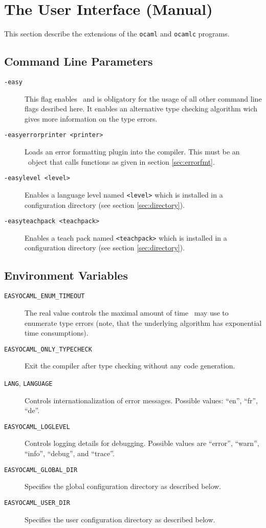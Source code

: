 
\section{The User Interface (Manual)}
\label{sec:manual}

This section describe the extensions of the \texttt{ocaml} and \texttt{ocamlc} programs.

\subsection{Command Line Parameters}
\label{sec:commandlineflags}

\begin{description}
  \item[\texttt{-easy}] This flag enables \easyocaml\ and is obligatory for
    the usage of all other command line flags desribed here.
    It enables an alternative type checking algorithm wich gives more
    information on the type errors.
  \item[\texttt{-easyerrorprinter <printer>}] Loads an error formatting plugin
    into the compiler. This must be an \ocaml\ object that calls functions as
    given in section \ref{sec:errorfmt}.
  \item[\texttt{-easylevel <level>}] Enables a language level named
    \texttt{<level>} which is installed in a configuration directory (see
    section \ref{sec:directory}).
  \item[\texttt{-easyteachpack <teachpack>}] Enables a teach pack named
    \texttt{<teachpack>} which is installed in a configuration directory (see
    section \ref{sec:directory}).
\end{description}

\subsection{Environment Variables}
\label{sec:envvars}

\begin{description}
  \item[\texttt{EASYOCAML\_ENUM\_TIMEOUT}] \label{man:timeout}
    The real value controls the maximal amount of
    time \easyocaml\ may use to enumerate type errors (note, that the underlying
    algorithm has exponential time consumptions).
  \item[\texttt{EASYOCAML\_ONLY\_TYPECHECK}] Exit the compiler after type
    checking without any code generation.
  \item[\texttt{LANG}, \texttt{LANGUAGE}]  Controls internationalization of
    error messages.  Possible values: ``en'', ``fr'', ``de''.
  \item[\texttt{EASYOCAML\_LOGLEVEL}] Controls logging details for debugging.
    Possible values are ``error'', ``warn'', ``info'', ``debug'', and ``trace''.
  \item[\texttt{EASYOCAML\_GLOBAL\_DIR}] Specifies the global configuration
    directory as described below.
  \item[\texttt{EASYOCAML\_USER\_DIR}] Specifies the user configuration
    directory as described below.
\end{description}

